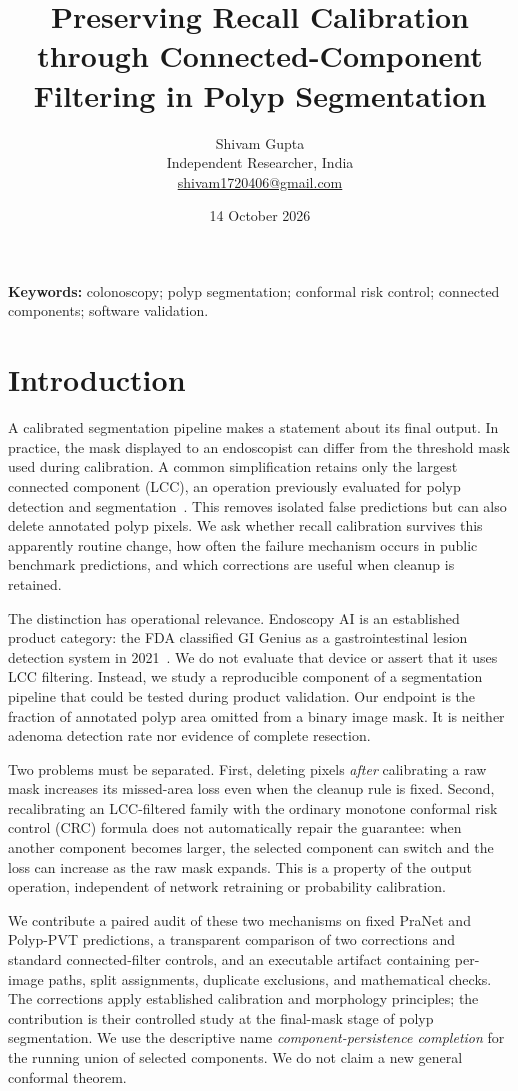 \documentclass[11pt,a4paper]{article}
\title{Preserving Recall Calibration through Connected-Component Filtering in Polyp Segmentation}
\author{Shivam Gupta\\\small Independent Researcher, India\\\small\href{mailto:shivam1720406@gmail.com}{shivam1720406@gmail.com}}
\date{14 October 2026}
\begin{document}
\maketitle

\noindent\textbf{Keywords:} colonoscopy; polyp segmentation; conformal risk control; connected components; software validation.

\section{Introduction}
A calibrated segmentation pipeline makes a statement about its final output. In practice, the mask displayed to an endoscopist can differ from the threshold mask used during calibration. A common simplification retains only the largest connected component (LCC), an operation previously evaluated for polyp detection and segmentation~\cite{cleanup}. This removes isolated false predictions but can also delete annotated polyp pixels. We ask whether recall calibration survives this apparently routine change, how often the failure mechanism occurs in public benchmark predictions, and which corrections are useful when cleanup is retained.

The distinction has operational relevance. Endoscopy AI is an established product category: the FDA classified GI Genius as a gastrointestinal lesion detection system in 2021~\cite{fda}. We do not evaluate that device or assert that it uses LCC filtering. Instead, we study a reproducible component of a segmentation pipeline that could be tested during product validation. Our endpoint is the fraction of annotated polyp area omitted from a binary image mask. It is neither adenoma detection rate nor evidence of complete resection.

Two problems must be separated. First, deleting pixels \emph{after} calibrating a raw mask increases its missed-area loss even when the cleanup rule is fixed. Second, recalibrating an LCC-filtered family with the ordinary monotone conformal risk control (CRC) formula does not automatically repair the guarantee: when another component becomes larger, the selected component can switch and the loss can increase as the raw mask expands. This is a property of the output operation, independent of network retraining or probability calibration.

We contribute a paired audit of these two mechanisms on fixed PraNet and Polyp-PVT predictions, a transparent comparison of two corrections and standard connected-filter controls, and an executable artifact containing per-image paths, split assignments, duplicate exclusions, and mathematical checks. The corrections apply established calibration and morphology principles; the contribution is their controlled study at the final-mask stage of polyp segmentation. We use the descriptive name \emph{component-persistence completion} for the running union of selected components. We do not claim a new general conformal theorem.
\end{document}
